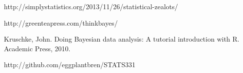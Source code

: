 \documentclass[a4paper, 12pt]{article}
\begin{document}
\begin{thebibliography}{999} %
http://simplystatistics.org/2013/11/26/statistical-zealots/

http://greenteapress.com/thinkbayes/

Kruschke, John. Doing Bayesian data analysis: A tutorial introduction with R. Academic Press, 2010.

http://github.com/eggplantbren/STATS331

\end{thebibliography}
\end{document}
